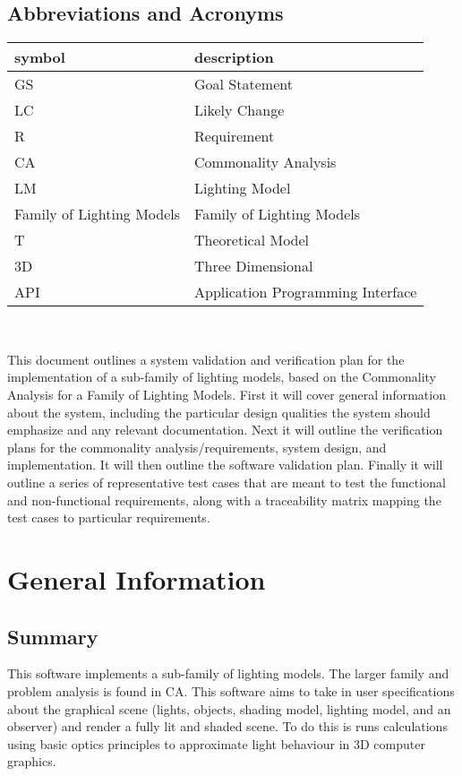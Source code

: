 \documentclass[12pt, titlepage]{article}
\newcommand{\famname}{Family of Lighting Models} %
\begin{document}
\subsection{Abbreviations and Acronyms}

\renewcommand{\arraystretch}{1.2}
\begin{tabular}{l l} 
	\toprule		
	\textbf{symbol} & \textbf{description}\\
	\midrule 
	GS & Goal Statement\\
	LC & Likely Change\\
	R & Requirement\\
	CA & Commonality Analysis \\
	LM & Lighting Model\\
	\famname{} & \famname{}\\
	T & Theoretical Model\\
	3D & Three Dimensional \\
	API & Application Programming Interface \\
	\bottomrule
\end{tabular}\\

\newpage


This document outlines a system validation and verification plan for the 
implementation of a sub-family of lighting models, based on the Commonality 
Analysis for a Family of Lighting Models. First it will cover general 
information about the system, including the particular design qualities the 
system should emphasize and any relevant documentation. Next it will outline 
the verification plans for the commonality analysis/requirements, system 
design, and implementation. It will then outline the software validation plan. 
Finally it will outline a series of representative test cases that are meant to 
test the functional and non-functional requirements, along with a traceability 
matrix mapping the test cases to particular requirements.

\section{General Information}

\subsection{Summary}
This software implements a sub-family of lighting models. The larger family and 
problem analysis is found in CA. This software aims to take in user 
specifications about the graphical scene (lights, objects, shading model, 
lighting model, and an observer) and render a fully lit and shaded scene. To do 
this is runs calculations using basic optics principles to approximate light 
behaviour in 3D computer graphics.
\end{document}
